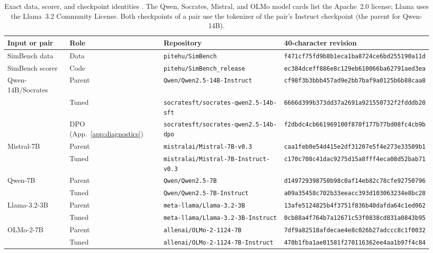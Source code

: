 \documentclass[11pt]{article}
\begin{document}
\begin{table}[t]
\centering
\scriptsize
\setlength{\tabcolsep}{3pt}
\begin{tabular}{@{}llll@{}}
\toprule
Input or pair & Role & Repository & 40-character revision \\
\midrule
SimBench data & Data & \texttt{pitehu/SimBench} & \texttt{f471cf75fd9b8b1eca1ba8724ce6bd255190a11d} \\
SimBench scorer & Code & \texttt{pitehu/SimBench\_release} & \texttt{ec384dceff886e8c129eb610066ba62791aed3ea} \\
Qwen-14B/Socrates & Parent & \texttt{Qwen/Qwen2.5-14B-Instruct} & \texttt{cf98f3b3bbb457ad9e2bb7baf9a0125b6b88caa8} \\
 & Tuned & \texttt{socratesft/socrates-qwen2.5-14b-sft} & \texttt{6666d399b373dd37a2691a921550732f2fdddb20} \\
 & DPO (App.~\ref{app:diagnostics}) & \texttt{socratesft/socrates-qwen2.5-14b-dpo} & \texttt{f2dbdc4cb661969100f870f177b77bd08fc4cb9b} \\
Mistral-7B & Parent & \texttt{mistralai/Mistral-7B-v0.3} & \texttt{caa1feb0e54d415e2df31207e5f4e273e33509b1} \\
 & Tuned & \texttt{mistralai/Mistral-7B-Instruct-v0.3} & \texttt{c170c708c41dac9275d15a8fff4eca08d52bab71} \\
Qwen-7B & Parent & \texttt{Qwen/Qwen2.5-7B} & \texttt{d149729398750b98c0af14eb82c78cfe92750796} \\
 & Tuned & \texttt{Qwen/Qwen2.5-7B-Instruct} & \texttt{a09a35458c702b33eeacc393d103063234e8bc28} \\
Llama-3.2-3B & Parent & \texttt{meta-llama/Llama-3.2-3B} & \texttt{13afe5124825b4f3751f836b40dafda64c1ed062} \\
 & Tuned & \texttt{meta-llama/Llama-3.2-3B-Instruct} & \texttt{0cb88a4f764b7a12671c53f0838cd831a0843b95} \\
OLMo-2-7B & Parent & \texttt{allenai/OLMo-2-1124-7B} & \texttt{7df9a82518afdecae4e8c026b27adccc8c1f0032} \\
 & Tuned & \texttt{allenai/OLMo-2-1124-7B-Instruct} & \texttt{470b1fba1ae01581f270116362ee4aa1b97f4c84} \\
\bottomrule
\end{tabular}
\caption{Exact data, scorer, and checkpoint identities
\cite{qwen25-14b-instruct-hf,socrates-qwen25-14b-sft-hf,socrates-qwen25-14b-dpo-hf,mistral-v03-model-card}.
The Qwen, Socrates, Mistral, and OLMo model cards list the Apache~2.0 license;
Llama uses the Llama~3.2 Community License. Both checkpoints of a pair use the
tokenizer of the pair's Instruct checkpoint (the parent for Qwen-14B).}
\label{tab:public-revisions}
\end{table}
\end{document}
